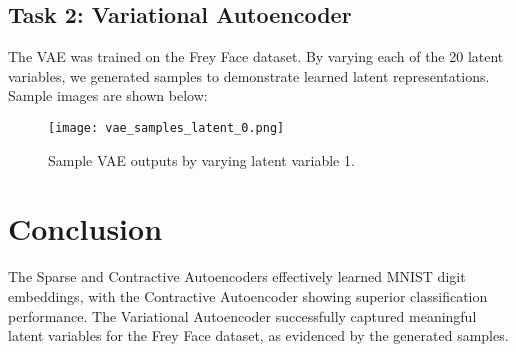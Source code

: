 \documentclass[a4paper,12pt]{article}
\begin{document}
\subsection{Task 2: Variational Autoencoder}
The VAE was trained on the Frey Face dataset. By varying each of the 20 latent variables, we generated samples to demonstrate learned latent representations. Sample images are shown below:

\begin{figure}[h]
    \centering
    \texttt{[image: vae\_samples\_latent\_0.png]}
    \caption{Sample VAE outputs by varying latent variable 1.}
\end{figure}

\section{Conclusion}
The Sparse and Contractive Autoencoders effectively learned MNIST digit embeddings, with the Contractive Autoencoder showing superior classification performance. The Variational Autoencoder successfully captured meaningful latent variables for the Frey Face dataset, as evidenced by the generated samples.
\end{document}
